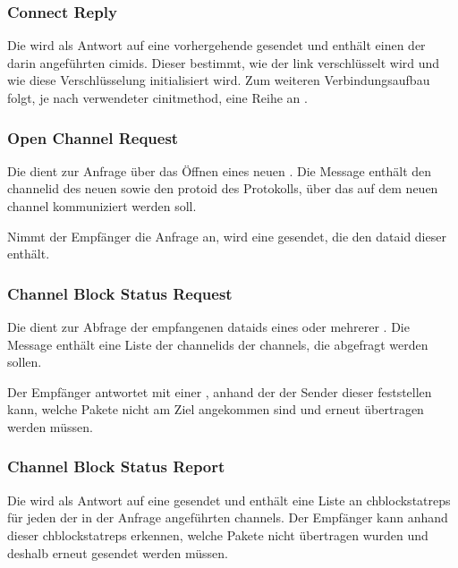 \bmcpconnectreqbytefield


\subsubsection*{Connect Reply}
\label{dcl-bmcp-connectrep}
Die \msg{\bmcpconnectrep} wird als Antwort auf eine vorhergehende
\msg{\bmcpconnectreq} gesendet und enthält einen der darin angeführten
\glspl{cimid}.
Dieser bestimmt, wie der \gls{link} verschlüsselt wird und wie diese
Verschlüsselung initialisiert wird.
Zum weiteren Verbindungsaufbau folgt, je nach verwendeter \gls{cinitmethod},
eine Reihe an \msgpl{\bmcpcryptoinit}.

\bmcpconnectrepbytefield


\subsubsection*{Open Channel Request}
\label{dcl-bmcp-openchreq}
Die \msg{\bmcpopenchreq} dient zur Anfrage über das Öffnen eines neuen
.
Die Message enthält den \gls{channelid} des neuen 
sowie den \gls{protoid} des Protokolls, über das auf dem neuen \gls{channel}
kommuniziert werden soll.

Nimmt der Empfänger die Anfrage an, wird eine \msg{\bmcpack} gesendet, die den
\gls{dataid} dieser \msg{\bmcpopenchreq} enthält.

\bmcpopenchreqbytefield


\subsubsection*{Channel Block Status Request}
\label{dcl-bmcp-chblockstatreq}
Die \msg{\bmcpchblockstatreq} dient zur Abfrage der empfangenen \glspl{dataid}
eines oder mehrerer .
Die Message enthält eine Liste der \glspl{channelid} der \glspl{channel}, die
abgefragt werden sollen.

Der Empfänger antwortet mit einer \msg{\bmcpchblockstatrep}, anhand der der
Sender dieser \msg{\bmcpchblockstatreq} feststellen kann, welche Pakete nicht
am Ziel angekommen sind und erneut übertragen werden müssen.

\bmcpchblockstatreqbytefield


\subsubsection*{Channel Block Status Report}
\label{dcl-bmcp-chblockstatrep}
Die \msg{\bmcpchblockstatrep} wird als Antwort auf eine
\msg{\bmcpchblockstatreq} gesendet und enthält eine Liste an
\glspl{chblockstatrep} für jeden der in der Anfrage angeführten \glspl{channel}.
Der Empfänger kann anhand dieser \glspl{chblockstatrep} erkennen, welche Pakete
nicht übertragen wurden und deshalb erneut gesendet werden müssen.

